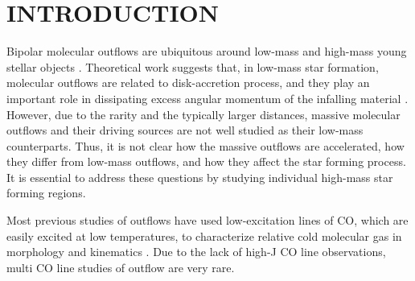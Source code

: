 \section{INTRODUCTION}
Bipolar molecular outflows are ubiquitous around low-mass and high-mass young stellar objects \citep{ 1985ARA&A..23..267L,1993prpl.conf..603F,2001ApJ...552L.167Z,2002A&A...383..892B,2015MNRAS.453..645M}. Theoretical work suggests that, in low-mass star formation, molecular outflows are related to disk-accretion process, and they play an important role in dissipating excess angular momentum of the infalling material \citep{1987ARA&A..25...23S, 1996ARA&A..34..111B}. However, due to the rarity and the typically larger distances, massive molecular outflows and their driving sources are not well studied as their low-mass counterparts. Thus, it is not clear how the massive outflows are accelerated, how they differ from low-mass outflows, and how they affect the star forming process. It is essential to address these questions by studying individual high-mass star forming regions. 

Most previous studies of outflows have used low-excitation lines of CO, which are easily excited at low temperatures, to characterize relative cold molecular gas in morphology and kinematics \citep{2009ApJ...696...66Q,  2009ApJ...702L..66Q, 2011ApJ...728....6Q}. Due to the lack of high-J CO line observations, multi CO line studies of outflow are very rare. 

